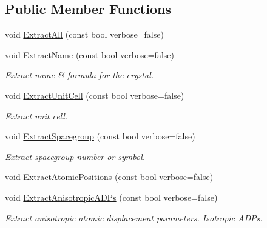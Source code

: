 \subsection*{Public Member Functions}
\begin{DoxyCompactItemize}
\item 
void \mbox{\hyperlink{class_obj_cryst_1_1_c_i_f_data_a406e1448ca864b4d679edde83c6351ab}{Extract\+All}} (const bool verbose=false)
\item 
void \mbox{\hyperlink{class_obj_cryst_1_1_c_i_f_data_a57e9ec3f37cfe8c272cc102280f08d66}{Extract\+Name}} (const bool verbose=false)
\begin{DoxyCompactList}\small\item\em Extract name \& formula for the crystal. \end{DoxyCompactList}\item 
\mbox{\label{class_obj_cryst_1_1_c_i_f_data_ab0ea11e45199961a3af2981a5ba335c5}} 
void \mbox{\hyperlink{class_obj_cryst_1_1_c_i_f_data_ab0ea11e45199961a3af2981a5ba335c5}{Extract\+Unit\+Cell}} (const bool verbose=false)
\begin{DoxyCompactList}\small\item\em Extract unit cell. \end{DoxyCompactList}\item 
\mbox{\label{class_obj_cryst_1_1_c_i_f_data_a9aa5afcbe90a074c4ace30ac5149526d}} 
void \mbox{\hyperlink{class_obj_cryst_1_1_c_i_f_data_a9aa5afcbe90a074c4ace30ac5149526d}{Extract\+Spacegroup}} (const bool verbose=false)
\begin{DoxyCompactList}\small\item\em Extract spacegroup number or symbol. \end{DoxyCompactList}\item 
void \mbox{\hyperlink{class_obj_cryst_1_1_c_i_f_data_ada558a6f28454cae868aef9710a785d7}{Extract\+Atomic\+Positions}} (const bool verbose=false)
\item 
\mbox{\label{class_obj_cryst_1_1_c_i_f_data_aeb07f0818672475c6ef2732e1254fd5a}} 
void \mbox{\hyperlink{class_obj_cryst_1_1_c_i_f_data_aeb07f0818672475c6ef2732e1254fd5a}{Extract\+Anisotropic\+A\+D\+Ps}} (const bool verbose=false)
\begin{DoxyCompactList}\small\item\em Extract anisotropic atomic displacement parameters. Isotropic A\+D\+Ps. \end{DoxyCompactList}\item 

\end{DoxyCompactItemize}
